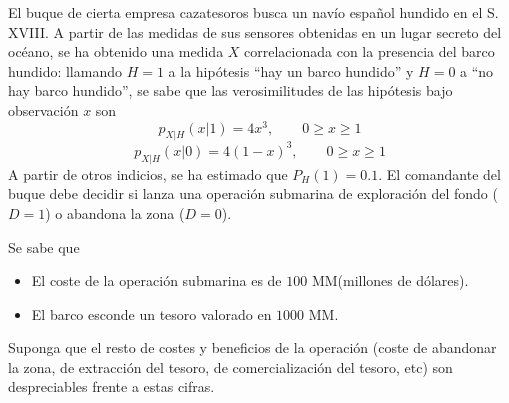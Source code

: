\ifspanish

\question[25] %

El buque de cierta empresa cazatesoros busca un navío español hundido en el S. XVIII. A partir de las medidas de sus sensores obtenidas en un lugar secreto del océano, se ha obtenido una medida $X$ correlacionada con la presencia del barco hundido: llamando $H=1$ a la hipótesis ``hay un barco hundido'' y $H=0$ a ``no hay barco hundido'', se sabe que las verosimilitudes de las hipótesis bajo observación $x$ son
$$p_{X|H}(x|1) = 4 x^3,     \qquad 0 \ge x \ge 1$$
$$p_{X|H}(x|0) = 4 (1-x)^3, \qquad 0 \ge x \ge 1$$
A partir de otros indicios, se ha estimado que $P_H(1) = 0.1$. El comandante del buque debe decidir si lanza una operación submarina de exploración del fondo ($D=1$) o abandona la zona ($D=0$).

Se sabe que
\begin{itemize}
\item El coste de la operación submarina es de $100$ MM\textdollar (millones de dólares).
\item El barco esconde un tesoro valorado en $1000$ MM\textdollar.
\end{itemize}

Suponga que el resto de costes y beneficios de la operación (coste de abandonar la zona, de extracción del tesoro,  de comercialización del tesoro, etc) son despreciables frente a estas cifras.


